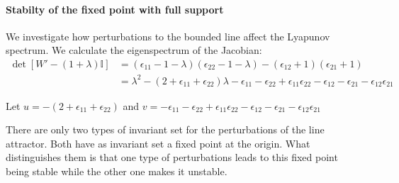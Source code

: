 \documentclass{article} %
\newcounter{ct}
\newcommand{\win}{\vW_{\text{in}}}
\newcommand{\wout}{\vW_{\text{out}}}
\newcommand{\bout}{\vb_{\text{out}}}
\theoremstyle{definition}
\theoremstyle{remark}
\begin{document}

%
%


\paragraph{Stabilty of the fixed point with full support}
We investigate how perturbations to the bounded line affect the Lyapunov spectrum.
We calculate the eigenspectrum of the Jacobian:
\begin{align*}
\det [W' -(1+\lambda)\mathbb{I}] &= (\epsilon_{11}-1-\lambda)(\epsilon_{22}-1-\lambda)-(\epsilon_{12}+1)(\epsilon_{21}+1)\\
&=\lambda^2 - (2+\epsilon_{11}+\epsilon_{22})\lambda -\epsilon_{11}-\epsilon_{22}+\epsilon_{11}\epsilon_{22} -\epsilon_{12} - \epsilon_{21} - \epsilon_{12}\epsilon_{21}
\end{align*}

Let
\(u=- (2+\epsilon_{11}+\epsilon_{22})\)
and
\(v=-\epsilon_{11}-\epsilon_{22}+\epsilon_{11}\epsilon_{22} -\epsilon_{12} - \epsilon_{21} - \epsilon_{12}\epsilon_{21}\)

There are only two types of invariant set for the perturbations of the line attractor. Both have as invariant set a fixed point at the origin. What distinguishes them is that one type of perturbations leads to this fixed point being stable while the other one makes it unstable.
\end{document}
